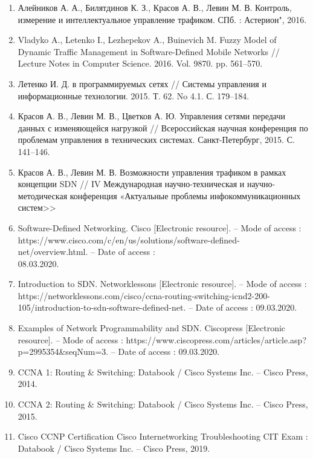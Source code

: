 
\begin{enumerate}[{label=\arabic{*}}]
    \item Алейников А. А., Билятдинов К. З., Красов А. В., Левин М. В. Контроль, измерение и интеллектуальное управление трафиком. СПб. : Астерион", 2016.
    \item Vladyko A., Letenko I., Lezhepekov A., Buinevich M. Fuzzy Model of Dynamic Traffic Management in Software-Defined Mobile Networks // Lecture Notes in Computer Science. 2016. Vol. 9870.
pp. 561–570.
    \item Летенко И. Д. в программируемых сетях // Системы управления и информационные технологии. 2015. Т. 62. No 4.1. С. 179–184.
    \item Красов А. В., Левин М. В., Цветков А. Ю. Управления сетями передачи данных с изменяющейся нагрузкой // Всероссийская научная конференция по проблемам управления в технических системах. Санкт-Петербург, 2015. С. 141–146.
    \item Красов А. В., Левин М. В. Возможности управления трафиком в рамках концепции
SDN // IV Международная научно-техническая и научно-методическая конференция «Актуальные проблемы инфокоммуникационных систем>>
    \item Software-Defined Networking. Cisco [Electronic resource]. – Mode of access : \\
    https://www.cisco.com/c/en/us/solutions/software-defined-net/overview.html. – Date of access : \\
    08.03.2020.
    \item Introduction to SDN. Networklessons [Electronic resource]. – Mode of access : \\
    https://network\-lessons.com/cisco/ccna-routing-switching-icnd2-200-105/introduction-to-sdn-softwa\-re-defined-net. – Date of access : 09.03.2020.
    \item Examples of Network Programmability and SDN. Ciscopress [Electronic resource]. – Mode of access : https://www.ciscopress.com/articles/article.asp?p=2995354\&seqNum=3. – Date of access : 09.03.2020.
    \item CCNA 1: Routing \& Switching: Databook / Cisco Systems Inc. – Cisco Press, 2014.
    \item CCNA 2: Routing \& Switching: Databook / Cisco Systems Inc. – Cisco Press, 2015.
    \item Cisco CCNP Certification Cisco Internetworking Troubleshooting CIT Exam : Databook / Cisco Systems Inc. – Cisco Press, 2019.

\end{enumerate}

